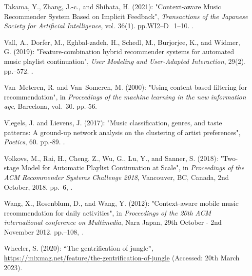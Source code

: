 \documentclass[11pt,titlepage,oneside]{book}
\begin{document}
\begin{thebibliography}{97}
	Takama, Y., Zhang, J.-c., and Shibata, H. (2021): "Context-aware
		{Music} {Recommender} {System} {Based} on {Implicit} {Feedback}",
	\textit{Transactions of the Japanese Society for Artificial Intelligence},
	vol. 36(1). pp.\ignorespaces WI2--D\_1--10. .
	
	Vall, A., Dorfer, M., Eghbal-zadeh, H., Schedl, M., Burjorjee, K., and Widmer,
	G. (2019): "Feature-combination hybrid recommender systems for
		automated music playlist continuation", \textit{User Modeling and
		User-Adapted Interaction}, 29(2). pp.--572.
	.
	
	Van~Meteren, R. and Van~Someren, M. (2000): "Using content-based
		filtering for recommendation", in \textit{Proceedings of the machine learning in the new information age}, Barcelona, vol.~30. pp.-56.
	
	Vlegels, J. and Lievens, J. (2017): "Music classification, genres, and
		taste patterns: {A} ground-up network analysis on the clustering of artist
		preferences", \textit{Poetics}, 60. pp.-89.
	.
	
	Volkovs, M., Rai, H., Cheng, Z., Wu, G., Lu, Y., and Sanner, S. (2018):
	"Two-stage {Model} for {Automatic} {Playlist} {Continuation} at
		{Scale}", in \textit{Proceedings of the {ACM} {Recommender} {Systems}
		{Challenge} 2018}, Vancouver, BC, Canada, 2nd October, 2018. pp.--6,
	.
	
	Wang, X., Rosenblum, D., and Wang, Y. (2012): "Context-aware mobile
		music recommendation for daily activities", in \textit{Proceedings of the
		20th {ACM} international conference on {Multimedia}}, Nara Japan, 29th October - 2nd November 2012.
	pp.--108, .
	
	Wheeler, S. (2020): \enquote{The gentrification of jungle},
	\urlprefix\url{https://mixmag.net/feature/the-gentrification-of-jungle} (Accessed: 20th March 2023).
	

\end{thebibliography}
\end{document}
